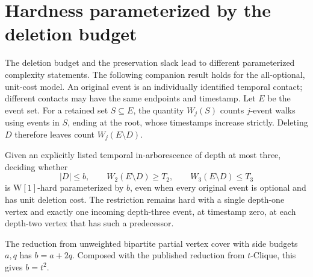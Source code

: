 
\section{Hardness parameterized by the deletion budget}
\label{hard:section}

The deletion budget and the preservation slack lead to different
parameterized complexity statements. The following companion result holds for the all-optional, unit-cost model. An original event is an
individually identified temporal contact; different contacts may have the
same endpoints and timestamp. Let \(E\) be the event set. For a retained
set \(S\subseteq E\), the quantity \(W_j(S)\) counts \(j\)-event walks
using events in \(S\), ending at the root, whose timestamps increase
strictly. Deleting \(D\) therefore leaves count \(W_j(E\setminus D)\).

\begin{theorem}
\label{hard:budget}
Given an explicitly listed temporal in-arborescence of depth at most three,
deciding whether
\[
 |D|\le b,\qquad W_2(E\setminus D)\ge T_2,\qquad
 W_3(E\setminus D)\le T_3
\]
is \(\mathrm{W}[1]\)-hard parameterized by \(b\), even when every original
event is optional and has unit deletion cost. The restriction remains hard
with a single depth-one vertex and exactly one incoming depth-three event,
at timestamp zero, at each depth-two vertex that has such a predecessor.

The reduction from unweighted bipartite partial vertex cover with side
budgets \(a,q\) has \(b=a+2q\). Composed with the published reduction from
\(t\)-Clique, this gives \(b=t^2\).
\end{theorem}

